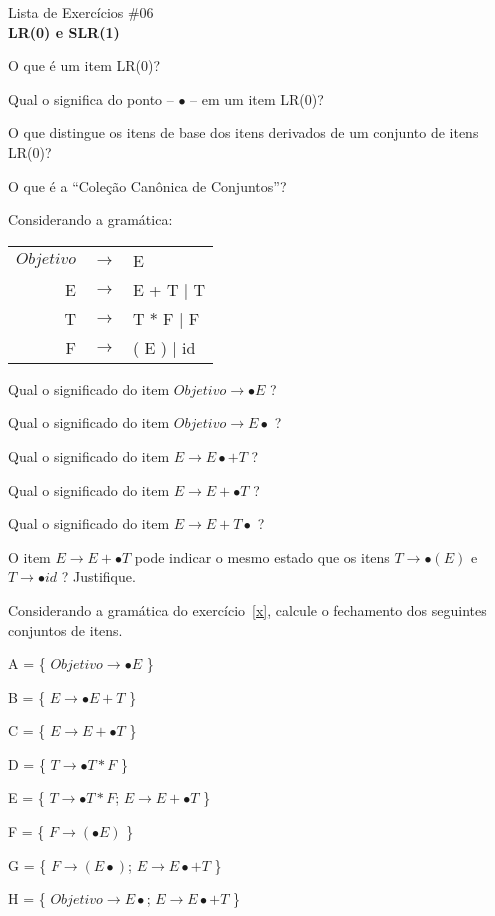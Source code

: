 \documentclass{compiladores}
\begin{document}
\begin{center}
{\LARGE Lista de Exercícios \#06}\\
{\bf LR(0) e SLR(1)}
\end{center}

\begin{listanumerada}
\item O que é um item LR(0)?
\item Qual o significa do ponto -- $\bullet$ -- em um item LR(0)?
\item O que distingue os itens de base dos itens derivados de um conjunto de itens LR(0)?
\item O que é a ``Coleção Canônica de Conjuntos''?
\item \label{x} Considerando a gramática: \\
     \begin{tabular}{rcl}
     $Objetivo$ & $\rightarrow$ & E \\
     E & $\rightarrow$ & E + T | T \\
     T & $\rightarrow$ & T $*$ F | F \\
     F & $\rightarrow$ & ( E ) | id
     \end{tabular}
     \begin{lista}
       \item Qual o significado do item $Objetivo \rightarrow \bullet E$ ?
       \item Qual o significado do item $Objetivo \rightarrow E \bullet$ ?
       \item Qual o significado do item $E \rightarrow E \bullet + T$ ?
       \item Qual o significado do item $E \rightarrow E + \bullet T$ ?
       \item Qual o significado do item $E \rightarrow E + T \bullet$ ?
       \item O item $E \rightarrow E + \bullet T$ pode indicar o mesmo
         estado que os itens $T \rightarrow \bullet (E)$ e $T
         \rightarrow \bullet id$ ? Justifique.
     \end{lista}

\item \label{xx} Considerando a gramática do exercício~\ref{x}, calcule o
  fechamento dos seguintes conjuntos de itens.
  \begin{lista}
    \item A = \{ $Objetivo \rightarrow \bullet E$ \}
    \item B = \{ $E \rightarrow \bullet E + T$ \}
    \item C = \{ $E \rightarrow E + \bullet T$ \}
    \item D = \{ $T \rightarrow \bullet T * F$ \}
    \item E = \{ $T \rightarrow \bullet T * F$; $E \rightarrow E + \bullet T$ \}
    \item F = \{ $F \rightarrow (\bullet E)$ \}
    \item G = \{ $F \rightarrow (E \bullet)$; $E \rightarrow E \bullet + T$ \}
    \item H = \{ $Objetivo \rightarrow E \bullet$; $E \rightarrow E \bullet + T$ \}
  \end{lista}


\end{listanumerada}
\end{document}
